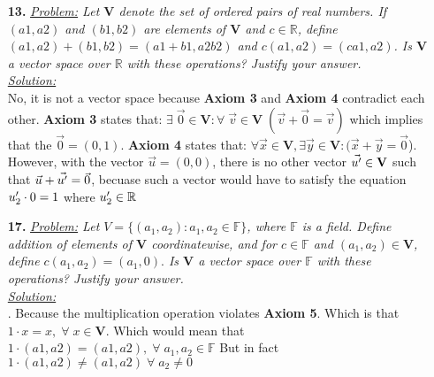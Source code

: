 \documentclass[11pt, fleqn]{article}
\newcommand{\vectSpace}[0]{\mathbf{V}}
\begin{document}
\begin{itemize}
    \item [\textbf{13.}]\textit{\underline{Problem:} Let $\mathbf{V}$ denote the set of ordered pairs of real numbers. If $(a1,a2)$ and $(b1, b2)$ are elements of $\mathbf{V}$ and $c \in \mathbb{R}$, define $(a1, a2) + (b1,b2) = (a1 + b1, a2b2)$ and $c(a1,a2) = (ca1,a2)$. Is $\mathbf{V}$ a vector space over $\mathbb{R}$ with these operations? Justify your answer.}\\[2ex]\textit{\underline{Solution:}}\\
    	No, it is not a vector space because \textbf{Axiom 3} and \textbf{Axiom 4} contradict each other. \textbf{Axiom 3} states that: $\exists\;\vec{0} \in \vectSpace : \forall \; \vec{v} \in \vectSpace \;(\vec{v} + \vec{0} = \vec{v})$ which implies that the $\vec{0} = (0, 1)$. \textbf{Axiom 4} states that: $\forall\vec{x} \in \vectSpace, \exists \vec{y} \in \vectSpace : (\vec{x}  + \vec{y}  = \vec{0}$). However, with the vector $\vec{u} = (0, 0)$, there is no other vector $\vec{u\rq} \in \vectSpace$ such that $\vec{u} + \vec{u\rq} = \vec{0}$, becuase such a vector would have to satisfy the equation $u\rq_2 \cdot 0 = 1$ where $u\rq_2 \in \mathbb{R}$
    
    \item [\textbf{17.}]
    \textit{\underline{Problem:} Let $V = \{(a_1,a_2): a_1,a_2 \in \mathbb{F}\}$, where $\mathbb{F}$ is a field. Define addition of elements of $\vectSpace$ coordinatewise, and for $c \in \mathbb{F}$ and $(a_1, a_2) \in \vectSpace$, define $c(a_1,a_2) = (a_1, 0).$ Is $\vectSpace$ a vector space over $\mathbb{F}$ with these operations? Justify your answer.}\\[2ex]\textit{\underline{Solution:}}\\
    	. Because the multiplication operation violates \textbf{Axiom 5}. Which is that $1\cdot x = x,\;\forall\;x\in\vectSpace$. Which would mean that $1\cdot(a1,a2) = (a1,a2), \;\forall \;a_1,a_2 \in \mathbb{F}$ But in fact  $1\cdot(a1,a2) \neq (a1,a2) \;\forall\; a_2 \neq 0$
\end{itemize}
\newpage
\end{document}
